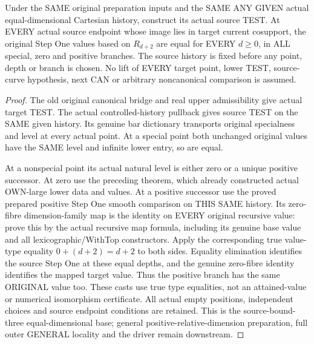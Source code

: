 \begin{theorem}
\label{hir:original-prepared-bound-three-all-stepone-etale-values}
\leanok
Under the SAME original preparation inputs and the SAME ANY GIVEN
actual equal-dimensional Cartesian history, construct its actual source
TEST. At EVERY actual source endpoint whose image lies in target
current cosupport, the original Step One values based on $R_{d+2}$
are equal for EVERY $d\geq0$, in ALL special, zero and positive branches.
The source history is fixed before any point, depth or branch is chosen.
No lift of EVERY target point, lower TEST, source-curve hypothesis,
next CAN or arbitrary noncanonical comparison is assumed.
\end{theorem}
\begin{proof}
The old original canonical bridge and real upper admissibility give
actual target TEST. The actual controlled-history pullback gives
source TEST on the SAME given history. Its genuine bar dictionary
transports original specialness and level at every actual point.
At a special point both unchanged original values have the SAME level
and infinite lower entry, so are equal.

At a nonspecial point its actual natural level is either zero or a
unique positive successor. At zero use the preceding theorem, which
already constructed actual OWN-large lower data and values. At a
positive successor use the proved prepared positive Step One smooth
comparison on THIS SAME history. Its zero-fibre dimension-family map
is the identity on EVERY original recursive value: prove this by the
actual recursive map formula, including its genuine base value and
all lexicographic/WithTop constructors. Apply the corresponding true
value-type equality $0+(d+2)=d+2$ to both sides. Equality elimination
identifies the source Step One at these equal depths, and the genuine
zero-fibre identity identifies the mapped target value. Thus the
positive branch has the same ORIGINAL value too. These casts use true
type equalities, not an attained-value or numerical isomorphism
certificate. All actual empty positions, independent choices and
source endpoint conditions are retained. This is the source-bound-three
equal-dimensional base; general positive-relative-dimension preparation,
full outer GENERAL locality and the driver remain downstream.
\end{proof}
